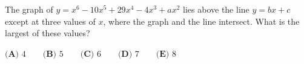 The graph of $y=x^6-10x^5+29x^4-4x^3+ax^2$ lies above the line $y=bx+c$ except at three values of $x$, where the graph and the line intersect. What is the largest of these values?

$\textbf{(A) }4\qquad\textbf{(B) }5\qquad\textbf{(C) }6\qquad\textbf{(D) }7\qquad\textbf{(E) }8$
